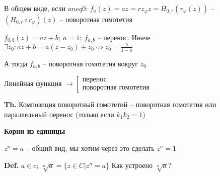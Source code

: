 \documentclass[14pt, letter paper]{article}
\begin{document}
В общем виде, если $a neq 0$: $f_a(z) = az = rz_\varphi z = H_{0, r}(r_\varphi(z))$ -- $(H_{0, r} \circ r_\varphi)(z)$ -- поворотная гомотетия

$f_{0, b}(z) = az + b;\ a = 1;\ f_{a, b}$ -- перенос. Иначе $\exists z_0 : az + b = a(z - z_0) + z_0 \Leftrightarrow z_0 = \frac{b}{1 - a}$

А тогда $f_{a, b}$ -- поворотная гомотетия вокруг $z_0$

Линейная функция $\rightarrow \left[ \begin{gathered}
    \text{перенос} \\
    \text{поворотная гомотетия}
\end{gathered} \right.$

\vspace{5mm}

\textbf{Th.} Композиция поворотный гомотетий -- поворотная гомотетия или параллельный перенос (только если $k_1k_2 = 1$)

\vspace{3mm}

\textbf{Корни из единицы}

$z^n = a$ -- общий вид, мы хотим через это сделать $z^n = 1$

\textbf{Def.} $a \in c;\ \sqrt[n]{a} = \{z \in C | z^n = a\}$ Как устроено $\sqrt[n]{a}$?
\end{document}
